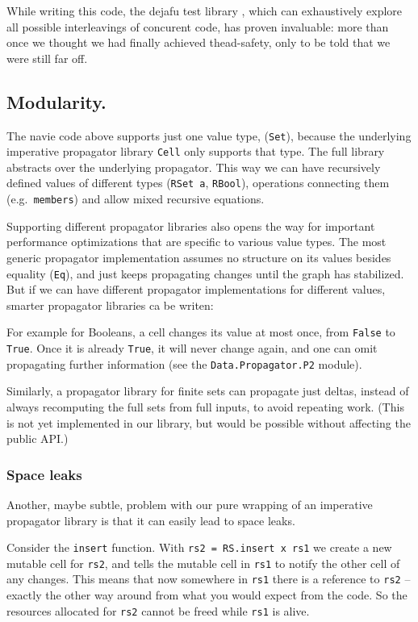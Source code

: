 \documentclass[manuscript,screen,acmsmall]{acmart}
\begin{document}
While writing this code, the dejafu test library \citep{dejafu}, which can exhaustively explore all possible interleavings of concurent code, has proven invaluable: more than once we thought we had finally achieved thead-safety, only to be told that we were still far off.

\subsection{Modularity.}

The navie code above supports just one value type, (\verb|Set|), because the underlying imperative propagator library \verb|Cell| only supports that type. The full library abstracts over the underlying propagator. This way we can have recursively defined values of different types (\verb|RSet a|, \verb|RBool|), operations connecting them (e.g.\ \verb|members|) and allow mixed recursive equations.

Supporting different propagator libraries also opens the way for important performance optimizations that are specific to various value types. The most generic propagator implementation assumes no structure on its values besides equality (\verb|Eq|), and just keeps propagating changes until the graph has stabilized. But if we can have different propagator implementations for different values, smarter propagator libraries ca be writen:

For example for Booleans, a cell changes its value at most once, from \verb|False| to \verb|True|. Once it is already \verb|True|, it will never change again, and one can omit propagating further information (see the \verb|Data.Propagator.P2| module).

Similarly, a propagator library for finite sets can propagate just deltas, instead of always recomputing the full sets from full inputs, to avoid repeating work. (This is not yet implemented in our library, but would be possible without affecting the public API.)

\subsubsection{Space leaks}\label{sec:spaceleak}

Another, maybe subtle, problem with our pure wrapping of an imperative propagator library is that it can easily lead to space leaks.

Consider the \verb|insert| function. With \verb|rs2 = RS.insert x rs1| we create a new mutable cell for \verb|rs2|, and tells the mutable cell in \verb|rs1| to notify the other cell of any changes. This means that now somewhere in \verb|rs1| there is a reference to \verb|rs2| -- exactly the other way around from what you would expect from the code. So the resources allocated for \verb|rs2| cannot be freed while \verb|rs1| is alive.
\end{document}
